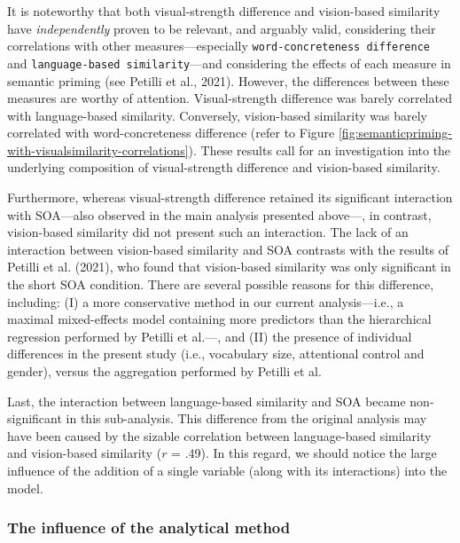 \documentclass[
  12pt,
  man,floatsintext]{apa7}
\begin{document}
It is noteworthy that both visual-strength difference and vision-based similarity have \emph{independently} proven to be relevant, and arguably valid, considering their correlations with other measures---especially \texttt{word-concreteness\ difference} and \texttt{language-based\ similarity}---and considering the effects of each measure in semantic priming (see Petilli et al., 2021). However, the differences between these measures are worthy of attention. Visual-strength difference was barely correlated with language-based similarity. Conversely, vision-based similarity was barely correlated with word-concreteness difference (refer to Figure \ref{fig:semanticpriming-with-visualsimilarity-correlations}). These results call for an investigation into the underlying composition of visual-strength difference and vision-based similarity.

Furthermore, whereas visual-strength difference retained its significant interaction with SOA---also observed in the main analysis presented above---, in contrast, vision-based similarity did not present such an interaction. The lack of an interaction between vision-based similarity and SOA contrasts with the results of Petilli et al. (2021), who found that vision-based similarity was only significant in the short SOA condition. There are several possible reasons for this difference, including: (I) a more conservative method in our current analysis---i.e., a maximal mixed-effects model containing more predictors than the hierarchical regression performed by Petilli et al.---, and (II) the presence of individual differences in the present study (i.e., vocabulary size, attentional control and gender), versus the aggregation performed by Petilli et al.

Last, the interaction between language-based similarity and SOA became non-significant in this sub-analysis. This difference from the original analysis may have been caused by the sizable correlation between language-based similarity and vision-based similarity (\(r\) = .49). In this regard, we should notice the large influence of the addition of a single variable (along with its interactions) into the model.

\hypertarget{the-influence-of-the-analytical-method}{%
\subsubsection{The influence of the analytical method}\label{the-influence-of-the-analytical-method}}
\end{document}
